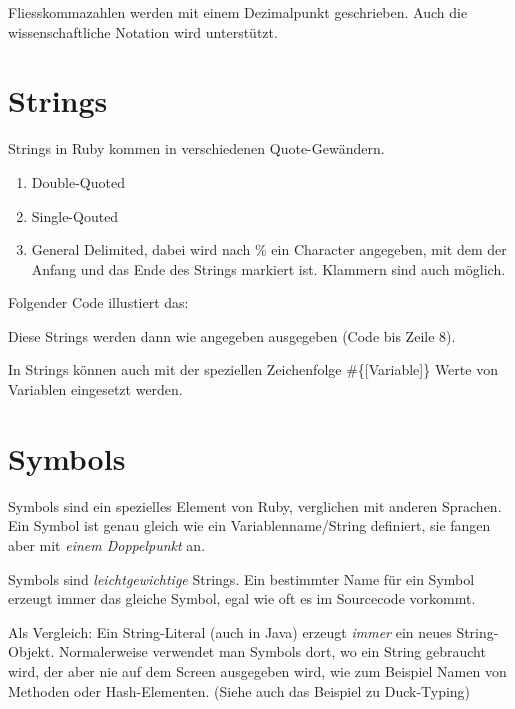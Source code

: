 \documentclass[a4book,11pt,twoside]{scrbook}
\begin{document}
Fliesskommazahlen werden mit einem Dezimalpunkt geschrieben. Auch die wissenschaftliche Notation wird unterstützt.








\section{Strings} %
\label{sec:strings}
Strings in Ruby kommen in verschiedenen Quote-Gewändern.
\begin{enumerate}
	\item Double-Quoted
	\item Single-Qouted
	\item General Delimited, dabei wird nach \% ein Character angegeben, mit dem der Anfang und das Ende des Strings markiert ist. Klammern sind auch möglich.
\end{enumerate}

Folgender Code illustiert das:


Diese Strings werden dann wie angegeben ausgegeben (Code bis Zeile 8).

In Strings können auch mit der speziellen Zeichenfolge \#\{[Variable]\} Werte von Variablen eingesetzt werden.





\section{Symbols} %
\label{sec:symbols}
Symbols sind ein spezielles Element von Ruby, verglichen mit anderen Sprachen. Ein Symbol ist genau gleich wie ein Variablenname/String definiert, sie fangen aber mit \emph{einem Doppelpunkt} an.

Symbols sind \emph{leichtgewichtige} Strings. Ein bestimmter Name für ein Symbol erzeugt immer das gleiche Symbol, egal wie oft es im Sourcecode vorkommt.

Als Vergleich: Ein String-Literal (auch in Java) erzeugt \emph{immer} ein neues String-Objekt. Normalerweise verwendet man Symbols dort, wo ein String gebraucht wird, der aber nie auf dem Screen ausgegeben wird, wie zum Beispiel Namen von Methoden oder Hash-Elementen. (Siehe auch das Beispiel zu Duck-Typing)

\newpage


\end{document}
